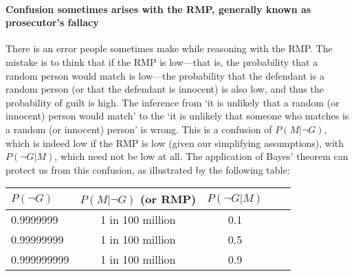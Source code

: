 \documentclass[10pt]{article}
\begin{document}
\begin{comment}
The likelihood ratio analysis presented here can be extended to other forms of trace evidence. 
It can be extended to fingerprints: instead of a genetic match, we will have a match 
between fingerprint profiles. The difference with DNA evidence is that we do not have a 
Random Match Probability for fingerprint profiles \citep{Zabell2005Fingerprint-Evi}. Besides fingerprints, the same 
analysis can be used for blood types, glass evidence, and any other type of trace evidence. 
But, again, we would need an estimate of the Random Match Probability 
which we often lack. 

\end{comment}


\paragraph{Confusion sometimes arises with the RMP, generally known as prosecutor's fallacy}
There is an error people sometimes make while reasoning with the RMP. The mistake is to think 
that if the RMP is low---that is, the probability that a random person would match is low---the 
probability that the defendant is a random person (or that the defendant is innocent) is also low, 
and thus the probability of guilt is high. 
The inference from `it is unlikely that a random (or innocent) person would match' to 
the  `it is unlikely that someone who matches is a random (or innocent) person' is wrong. 
This is a confusion of $P(M |\neg G)$, which is indeed low if the RMP is low (given our simplifying assumptions), 
with $P(\neg G | M)$, which need not be low at all. The application of Bayes' theorem can 
protect us from this confusion, as illustrated by the following table: 

\vspace{2mm}
\hspace{0.5cm}
\begin{centering}
\begin{tabular}{lcccc}
\hline
$P(\neg G)$ &  $P(M | \neg G)$ (or RMP) &   $P(\neg G | M)$ \\
\hline
0.9999999 & 1 in 100 million & 0.1  \\
0.99999999 & 1 in 100 million & 0.5  \\
0.999999999 & 1 in 100 million  & 0.9  \\
\hline
\end{tabular}
\end{centering}
\vspace{2mm}
\end{document}
